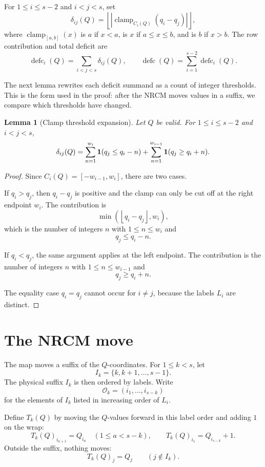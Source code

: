 \documentclass[10pt]{article}
\newtheorem{lemma}{Lemma}
\newcommand{\defc}{\operatorname{defc}}
\newcommand{\clamp}{\operatorname{clamp}}
\begin{document}
For \(1\le i\le s-2\) and \(i<j<s\), set
\[
  \delta_{ij}(Q)=
  \left\lfloor
  \left|
  \clamp_{C_i(Q)}(q_i-q_j)
  \right|
  \right\rfloor,
\]
where \(\clamp_{[a,b]}(x)\) is \(a\) if \(x<a\), is \(x\) if
\(a\le x\le b\), and is \(b\) if \(x>b\).  The row contribution and total
deficit are
\[
  \defc_i(Q)=\sum_{i<j<s}\delta_{ij}(Q),
  \qquad
  \defc(Q)=\sum_{i=1}^{s-2}\defc_i(Q).
\]

The next lemma rewrites each deficit summand as a count of integer thresholds.
This is the form used in the proof: after the NRCM moves values in a suffix,
we compare which thresholds have changed.

\begin{lemma}[Clamp threshold expansion]
Let \(Q\) be valid.  For \(1\le i\le s-2\) and \(i<j<s\),
\[
  \delta_{ij}(Q)=
  \sum_{n=1}^{w_i}{\bf 1}(q_j\le q_i-n)
  +
  \sum_{n=1}^{w_{i-1}}{\bf 1}(q_j\ge q_i+n).
\]
\end{lemma}

\begin{proof}
Since \(C_i(Q)=[-w_{i-1},w_i]\), there are two cases.

If \(q_i>q_j\), then \(q_i-q_j\) is positive and the clamp can only be cut off
at the right endpoint \(w_i\).  The contribution is
\[
  \min\!\left(\left\lfloor q_i-q_j\right\rfloor,w_i\right),
\]
which is the number of integers \(n\) with \(1\le n\le w_i\) and
\[
  q_j\le q_i-n.
\]

If \(q_i<q_j\), the same argument applies at the left endpoint.  The
contribution is the number of integers \(n\) with \(1\le n\le w_{i-1}\) and
\[
  q_j\ge q_i+n.
\]

The equality case \(q_i=q_j\) cannot occur for \(i\ne j\), because the labels
\(L_i\) are distinct.
\end{proof}

\section{The NRCM move}

The map moves a suffix of the \(Q\)-coordinates.  For \(1\le k<s\), let
\[
  I_k=\{k,k+1,\ldots,s-1\}.
\]
The physical suffix \(I_k\) is then ordered by labels.  Write
\[
  \mathcal O_k=(i_1,\ldots,i_{s-k})
\]
for the elements of \(I_k\) listed in increasing order of \(L_i\).

Define \(T_k(Q)\) by moving the \(Q\)-values forward in this label order and
adding \(1\) on the wrap:
\[
  T_k(Q)_{i_{a+1}}=Q_{i_a}\quad(1\le a<s-k),
  \qquad
  T_k(Q)_{i_1}=Q_{i_{s-k}}+1.
\]
Outside the suffix, nothing moves:
\[
  T_k(Q)_j=Q_j\qquad(j\notin I_k).
\]
\end{document}
